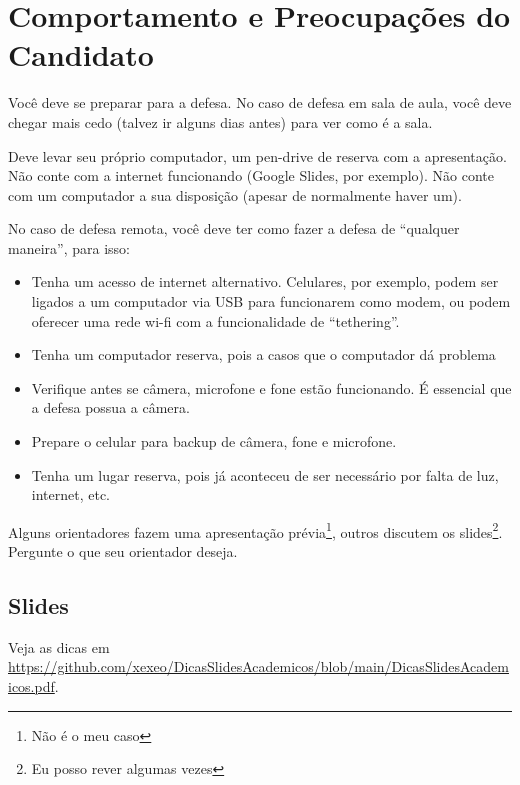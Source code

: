 \section{Comportamento e Preocupações do Candidato}

Você deve se preparar para a defesa. No caso de defesa em sala de aula, você deve chegar mais cedo (talvez ir alguns dias antes) para ver como é a sala. 

Deve levar seu próprio computador, um pen-drive de reserva com a apresentação. Não conte com a internet funcionando (Google Slides, por exemplo). Não conte com um computador a sua disposição (apesar de normalmente haver um). 

No caso de defesa remota, você deve ter como fazer a defesa de ``qualquer maneira'', para isso:
\begin{itemize}
    \item Tenha um acesso de internet alternativo. Celulares, por exemplo, podem ser ligados a um computador via USB para funcionarem como modem, ou podem oferecer uma rede wi-fi com a funcionalidade de ``tethering''.
    \item Tenha um computador reserva, pois a casos que o computador dá problema
    \item Verifique antes se câmera, microfone e fone estão funcionando. É essencial que a defesa possua a câmera.
    \item Prepare o celular para backup de câmera, fone e microfone.
    \item Tenha um lugar reserva, pois já aconteceu de ser necessário por falta de luz, internet, etc. 
\end{itemize}

Alguns orientadores fazem uma apresentação prévia\footnote{Não é o meu caso}, outros discutem os slides\footnote{Eu posso rever algumas vezes}. Pergunte o que seu orientador deseja.



\subsection{Slides}

Veja as dicas em \url{https://github.com/xexeo/DicasSlidesAcademicos/blob/main/DicasSlidesAcademicos.pdf}.

